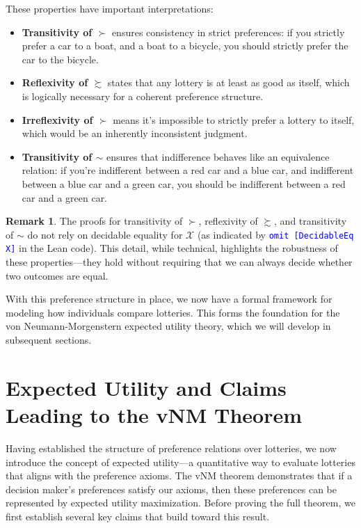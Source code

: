 \documentclass{article}
\theoremstyle{definition}
\newtheorem{remark}{Remark}[section]
\newcommand{\X}{\mathcal{X}}
\newcommand{\tactic}[1]{\textcolor{blue}{\texttt{#1}}}
\newcommand{\pref}{\succsim} %
\newcommand{\strictpref}{\succ} %
\newcommand{\indiff}{\sim} %
\begin{document}
These properties have important interpretations:

\begin{itemize}
    \item \textbf{Transitivity of $\strictpref$} ensures consistency in strict preferences: if you strictly prefer a car to a boat, and a boat to a bicycle, you should strictly prefer the car to the bicycle.

    \item \textbf{Reflexivity of $\pref$} states that any lottery is at least as good as itself, which is logically necessary for a coherent preference structure.

    \item \textbf{Irreflexivity of $\strictpref$} means it's impossible to strictly prefer a lottery to itself, which would be an inherently inconsistent judgment.

    \item \textbf{Transitivity of $\indiff$} ensures that indifference behaves like an equivalence relation: if you're indifferent between a red car and a blue car, and indifferent between a blue car and a green car, you should be indifferent between a red car and a green car.
\end{itemize}

\begin{remark}
The proofs for transitivity of $\strictpref$, reflexivity of $\pref$, and transitivity of $\indiff$ do not rely on decidable equality for $\X$ (as indicated by \tactic{omit [DecidableEq X]} in the Lean code). This detail, while technical, highlights the robustness of these properties—they hold without requiring that we can always decide whether two outcomes are equal.
\end{remark}

With this preference structure in place, we now have a formal framework for modeling how individuals compare lotteries. This forms the foundation for the von Neumann-Morgenstern expected utility theory, which we will develop in subsequent sections.

\section{Expected Utility and Claims Leading to the vNM Theorem}\label{sec:claims}

Having established the structure of preference relations over lotteries, we now introduce the concept of expected utility—a quantitative way to evaluate lotteries that aligns with the preference axioms. The vNM theorem demonstrates that if a decision maker's preferences satisfy our axioms, then these preferences can be represented by expected utility maximization. Before proving the full theorem, we first establish several key claims that build toward this result.
\end{document}

